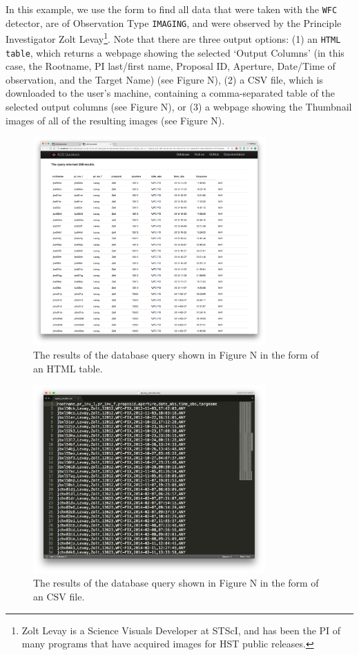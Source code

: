 \documentclass[10pt,journal,compsoc]{IEEEtran}
\begin{document}
In this example, we use the form to find all data that were taken with the \texttt{WFC} detector,
are of Observation Type \texttt{IMAGING}, and were observed by the Principle Investigator Zolt
Levay\footnote{Zolt Levay is a Science Visuals Developer at STScI, and has been the PI of many
programs that have acquired images for HST public releases.}.  Note that there are three output
options: (1) an \texttt{HTML table}, which returns a webpage showing the selected `Output Columns'
(in this case, the Rootname, PI last/first name, Proposal ID, Aperture, Date/Time of observation,
and the Target Name) (see Figure N), (2) a CSV file, which is downloaded to the user's machine,
containing a comma-separated table of the selected output columns (see Figure N), or (3) a webpage
showing the Thumbnail images of all of the resulting images (see Figure N).

\begin{figure}[!t]
\centering
\includegraphics[width=3.5in]{./figures/database_query_results_html.png}
\caption{The results of the database query shown in Figure N in the form of an HTML
table.}
\label{fig1}
\end{figure}

\begin{figure}[!t]
\centering
\includegraphics[width=3.5in]{./figures/database_query_results_csv.png}
\caption{The results of the database query shown in Figure N in the form of an CSV
file.}
\label{fig1}
\end{figure}
\end{document}
